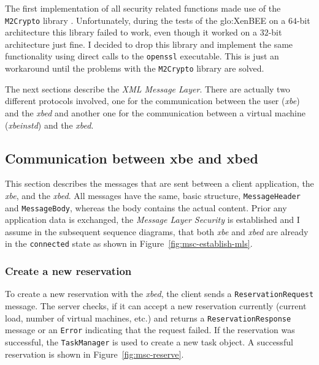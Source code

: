 \medskip

The first implementation of all security related functions made use of the
\texttt{M2Crypto}  library  \cite{m2crypto}.   Unfortunately,  during  the
tests  of the  \gls{glo:XenBEE} on  a $64$-bit  architecture  this library
failed  to work, even  though it  worked on  a $32$-bit  architecture just
fine. I decided to drop  this library and implement the same functionality
using direct  calls to the  \texttt{openssl} executable.  This is  just an
workaround  until  the problems  with  the  \texttt{M2Crypto} library  are
solved.

The  next  sections describe  the  \emph{XML  Message  Layer}.  There  are
actually  two  different protocols  involved,  one  for the  communication
between the user (\emph{xbe}) and  the \emph{xbed} and another one for the
communication  between   a  virtual  machine   (\emph{xbeinstd})  and  the
\emph{xbed}.

\subsection{Communication between xbe and xbed}

This  section  describes the  messages  that  are  sent between  a  client
application, \ie  the \emph{xbe}, and  the \emph{xbed}. All  messages have
the    same,    basic    structure,   \ie    \texttt{MessageHeader}    and
\texttt{MessageBody}, whereas the body  contains the actual content. Prior
any application  data is exchanged,  the \emph{Message Layer  Security} is
established and  I assume in  the subsequent sequence diagrams,  that both
\emph{xbe} and \emph{xbed} are  already in the \texttt{connected} state as
shown in Figure~\ref{fig:msc-establish-mls}.

\subsubsection{Create a new reservation}

To  create a  new reservation  with the  \emph{xbed}, the  client  sends a
\texttt{ReservationRequest} message.  The server  checks, if it can accept
a  new reservation currently  (current load,  number of  virtual machines,
etc.)    and  returns   a  \texttt{ReservationResponse}   message   or  an
\texttt{Error} indicating that the  request failed. If the reservation was
successful,  the  \texttt{TaskManager}  is  used  to  create  a  new  task
object. A successful reservation is shown in Figure~\ref{fig:msc-reserve}.


